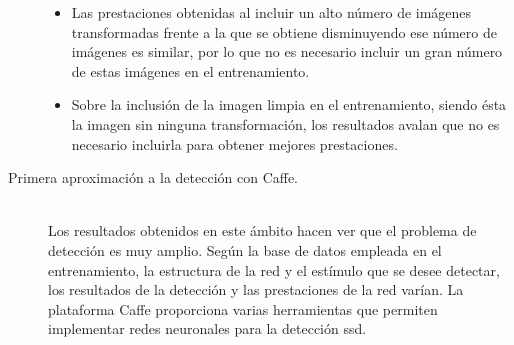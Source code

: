 \begin{description}
\begin{itemize}
		\item Las prestaciones obtenidas al incluir un alto número de imágenes transformadas frente a la que se obtiene disminuyendo ese número de imágenes es similar, por lo que no es necesario incluir un gran número de estas imágenes en el entrenamiento.
		\item Sobre la inclusión de la imagen limpia en el entrenamiento, siendo ésta la imagen sin ninguna transformación, los resultados avalan que no es necesario incluirla para obtener mejores prestaciones.
	\end{itemize}
	\item[Primera aproximación a la detección con Caffe.] \hfill 
	\vspace{5pt}
	\\
	Los resultados obtenidos en este ámbito hacen ver que el problema de detección es muy amplio. Según la base de datos empleada en el entrenamiento, la estructura de la red y el estímulo que se desee detectar, los resultados de la detección y las prestaciones de la red varían. La plataforma Caffe proporciona varias herramientas que permiten implementar redes neuronales para la detección \acrshort{ssd}.
\end{description}

